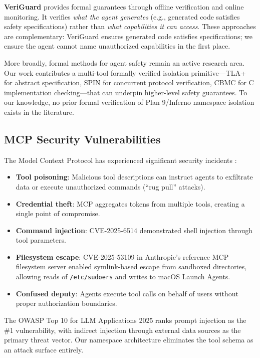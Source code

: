 \documentclass[acmsmall,screen,review]{acmart}
\begin{document}
\textbf{VeriGuard} \cite{veriguard2025} provides formal guarantees through offline verification and online monitoring. It verifies \textit{what the agent generates} (e.g., generated code satisfies safety specifications) rather than \textit{what capabilities it can access}. These approaches are complementary: VeriGuard ensures generated code satisfies specifications; we ensure the agent cannot name unauthorized capabilities in the first place.

More broadly, formal methods for agent safety remain an active research area. Our work contributes a multi-tool formally verified isolation primitive---TLA+ for abstract specification, SPIN for concurrent protocol verification, CBMC for C implementation checking---that can underpin higher-level safety guarantees. To our knowledge, no prior formal verification of Plan 9/Inferno namespace isolation exists in the literature.

\subsection{MCP Security Vulnerabilities}

The Model Context Protocol has experienced significant security incidents \cite{pillar2025mcp,willison2025mcp,unit42mcp2025}:

\begin{itemize}
    \item \textbf{Tool poisoning}: Malicious tool descriptions can instruct agents to exfiltrate data or execute unauthorized commands (``rug pull'' attacks).
    \item \textbf{Credential theft}: MCP aggregates tokens from multiple tools, creating a single point of compromise.
    \item \textbf{Command injection}: CVE-2025-6514 \cite{nvd2025cve6514} demonstrated shell injection through tool parameters.
    \item \textbf{Filesystem escape}: CVE-2025-53109 \cite{nvdCVE202553109} in Anthropic's reference MCP filesystem server enabled symlink-based escape from sandboxed directories, allowing reads of \texttt{/etc/sudoers} and writes to macOS Launch Agents.
    \item \textbf{Confused deputy}: Agents execute tool calls on behalf of users without proper authorization boundaries.
\end{itemize}

The OWASP Top 10 for LLM Applications 2025 \cite{owasp2025llm} ranks prompt injection as the \#1 vulnerability, with indirect injection through external data sources as the primary threat vector. Our namespace architecture eliminates the tool schema as an attack surface entirely.
\end{document}
